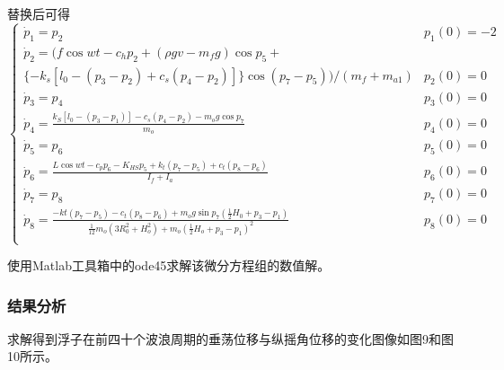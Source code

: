 \documentclass{my_paper}
\begin{document}
替换后可得
\begin{equation}
      \left\{\begin{matrix}
\displaystyle\dot p_1=p_2     &  p_1(0)=-2 \\
\displaystyle \dot p_2=(f\cos wt-c_hp_2+(\rho gv-m_fg )\cos p_5+ \\
\{-k_s[l_0-(p_3-p_2)+c_s(p_4-p_2)]\}\cos(p_7-p_5))/(m_f+m_{a1})    & p_2(0)=0   \\
\displaystyle\dot p_3=p_4     &  p_3(0)=0 \\[3mm]
\displaystyle\dot p_4=\frac{k_S[l_0-(p_3-p_1)]-c_s(p_4-p_2)-m_o g \cos p_7}{m_o}    & p_4(0)=0 \\
\displaystyle\dot p_5=p_6     & p_5(0)=0  \\[3mm]
\displaystyle\dot p_6= \frac{L\cos wt -c_pp_6-K_{HS}p_5+k_t(p_7-p_5)+c_t(p_8-p_6)}{I_f+I_a}    &  p_6(0)=0 \\
\displaystyle\dot p_7=p_8     & p_7(0)=0  \\[3mm]
\displaystyle\dot p_8=\frac{-kt(p_7-p_5)-c_t(p_8-p_6)+m_og\sin p_7(\frac{1}{2}H_0+p_3-p_1)}{\frac{1}{12}m_o(3R_0^2+H_o^2)+m_o(\frac{1}{2}H_o+p_3-p_1)^2}     & p_8(0)=0  \\
   \end{matrix}\right. 
\end{equation}

使用Matlab工具箱中的ode45求解该微分方程组的数值解。

\subsubsection{结果分析}
求解得到浮子在前四十个波浪周期的垂荡位移与纵摇角位移的变化图像如图9和图10所示。
\newpage
\end{document}
